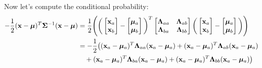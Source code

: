 Now let's compute the conditional probability:
\begin{align*}
	-\frac{1}{2}(\mathbf{x}-\boldsymbol{\mu})^T\boldsymbol{\Sigma}^{-1}(\mathbf{x}-\boldsymbol{\mu}) &= \frac{1}{2}\Bigg(\bigg(\begin{bmatrix}
		{\mathbf{x}}_a\\
		{\mathbf{x}}_b
	\end{bmatrix}-
	\begin{bmatrix}
		\boldsymbol{\mu}_a\\
		\boldsymbol{\mu}_b
	\end{bmatrix} 
\bigg)^T\begin{bmatrix}
		{\bm{\Lambda}}_{aa} & {\bm{\Lambda}}_{ab}\\
		{\bm{\Lambda}}_{ba} & {\bm{\Lambda}}_{bb} 
	\end{bmatrix}\bigg(\begin{bmatrix}
		{\mathbf{x}}_a\\
		{\mathbf{x}}_b
	\end{bmatrix}-
	\begin{bmatrix}
		\boldsymbol{\mu}_a\\
		\boldsymbol{\mu}_b
	\end{bmatrix}\bigg)\Bigg)\\
	&= -\frac{1}{2}\big(({\mathbf{x}}_a-{\bm{\mu}}_a)^T{\bm{\Lambda}}_{aa}({\mathbf{x}}_a-{\bm{\mu}}_a)+({\mathbf{x}}_a-{\bm{\mu}}_a)^T{\bm{\Lambda}}_{ab}({\mathbf{x}}_a-{\bm{\mu}}_a)\\
	&\quad+({\mathbf{x}}_a-{\bm{\mu}}_a)^T{\bm{\Lambda}}_{ba}({\mathbf{x}}_a-{\bm{\mu}}_a)+({\mathbf{x}}_a-{\bm{\mu}}_a)^T{\bm{\Lambda}}_{bb}({\mathbf{x}}_a-{\bm{\mu}}_a)\big)\\
\end{align*}


